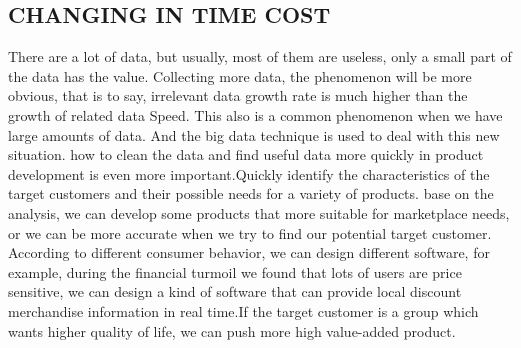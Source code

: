 \documentclass[sigconf]{acmart}
\begin{document}
\subsection{CHANGING IN TIME COST}
There are a lot of data, but usually, most of them are useless, only a small part of the data has the value. Collecting more data, the phenomenon will be more obvious, that is to say, irrelevant data growth rate is much higher than the growth of related data Speed. This also is a common phenomenon when we have large amounts of data. And the big data technique is used to deal with this new situation.
how to clean the data and find useful data more quickly in product development is even more important.Quickly identify the characteristics of the target customers and their possible needs for a variety of products. base on the analysis, we can develop some products that more suitable for marketplace needs, or we can be more accurate when we try to find our potential target customer. According to different consumer behavior, we can design different software, for example, during the financial turmoil we found that lots of users are price sensitive, we can design a kind of software that can provide local discount merchandise information in real time.If the target customer is a group which wants higher quality of life, we can push more high value-added product.
\end{document}
